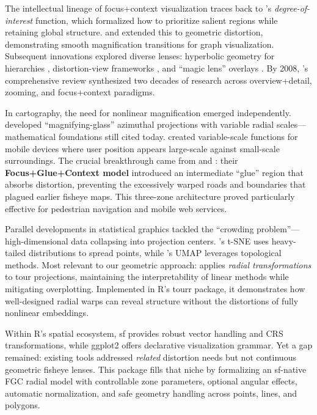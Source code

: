 The intellectual lineage of focus+context visualization traces back to \citet{furnas1986}'s \emph{degree-of-interest} function, which formalized how to prioritize salient regions while retaining global structure. \citet{sarkar1992} and \citet{sarkar1994} extended this to geometric distortion, demonstrating smooth magnification transitions for graph visualization. Subsequent innovations explored diverse lenses: hyperbolic geometry for hierarchies \citep{lamping1995}, distortion-view frameworks \citep{carpendale2001}, and ``magic lens'' overlays \citep{bier1993}. By 2008, \citet{cockburn2008}'s comprehensive review synthesized two decades of research across overview+detail, zooming, and focus+context paradigms.

In cartography, the need for nonlinear magnification emerged independently. \citet{snyder1987} developed ``magnifying-glass'' azimuthal projections with variable radial scales---mathematical foundations still cited today. \citet{harrie2002} created variable-scale functions for mobile devices where user position appears large-scale against small-scale surroundings. The crucial breakthrough came from \citet{yamamoto2009} and \citet{yamamoto2012}: their \textbf{Focus+Glue+Context model} introduced an intermediate ``glue'' region that absorbs distortion, preventing the excessively warped roads and boundaries that plagued earlier fisheye maps. This three-zone architecture proved particularly effective for pedestrian navigation and mobile web services.

Parallel developments in statistical graphics tackled the ``crowding problem''---high-dimensional data collapsing into projection centers. \citet{JMLR:v9:vandermaaten08a}'s t-SNE uses heavy-tailed distributions to spread points, while \citet{mcinnes2020umapuniformmanifoldapproximation}'s UMAP leverages topological methods. Most relevant to our geometric approach: \citet{laa2020} applies \emph{radial transformations} to tour projections, maintaining the interpretability of linear methods while mitigating overplotting. Implemented in R's tourr package, it demonstrates how well-designed radial warps can reveal structure without the distortions of fully nonlinear embeddings.

Within R's spatial ecosystem, sf \citep{RJ-2018-009} provides robust vector handling and CRS transformations, while ggplot2 \citep{wickham2016} offers declarative visualization grammar. Yet a gap remained: existing tools addressed \emph{related} distortion needs but not continuous geometric fisheye lenses. This package fills that niche by formalizing an sf-native FGC radial model with controllable zone parameters, optional angular effects, automatic normalization, and safe geometry handling across points, lines, and polygons.

